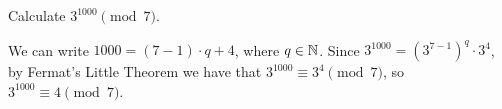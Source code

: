 \begin{example}
   Calculate $3^{1000} \pmod{7}$. 
\end{example}
\begin{solution}
   We can write $1000 = (7-1)\cdot q + 4$, where $q \in \mathbb{N}$. Since $3^{1000} = (3^{7-1})^q \cdot 3^4$, by Fermat's Little Theorem we have that $3^{1000} \equiv 3^4 \pmod{7}$, so $3^{1000} \equiv 4 \pmod{7}$. 
\end{solution}
